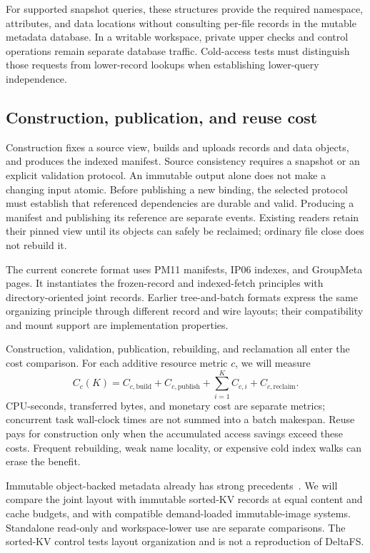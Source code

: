 For supported snapshot queries, these structures provide the required
namespace, attributes, and data locations without consulting per-file
records in the mutable metadata database. In a writable workspace, private
upper checks and control operations remain separate database traffic.
Cold-access tests must distinguish those requests from lower-record
lookups when establishing lower-query independence.

\subsection{Construction, publication, and reuse cost}

Construction fixes a source view, builds and uploads records and data
objects, and produces the indexed manifest. Source consistency requires a
snapshot or an explicit validation protocol. An immutable output alone
does not make a changing input atomic. Before publishing a new binding,
the selected protocol must establish that referenced dependencies are
durable and valid. Producing a manifest and publishing its reference are
separate events. Existing readers retain their pinned view until its
objects can safely be reclaimed; ordinary file close does not rebuild it.

The current concrete format uses PM11 manifests, IP06 indexes, and GroupMeta
pages. It instantiates the frozen-record and indexed-fetch principles with
directory-oriented joint records. Earlier tree-and-batch formats express
the same organizing principle through different record and wire layouts;
their compatibility and mount support are implementation properties.

Construction, validation, publication, rebuilding, and reclamation all enter
the cost comparison. For each additive resource metric $c$, we will measure
\begin{equation}
C_c(K)=C_{c,\mathrm{build}}+C_{c,\mathrm{publish}}
       +\sum_{i=1}^{K}C_{c,i}+C_{c,\mathrm{reclaim}}.
\end{equation}
CPU-seconds, transferred bytes, and monetary cost are separate metrics;
concurrent task wall-clock times are not summed into a batch makespan.
Reuse pays for construction only when the accumulated access savings exceed
these costs. Frequent rebuilding, weak name locality, or expensive cold
index walks can erase the benefit.

Immutable object-backed metadata already has strong
precedents~\cite{deltafs2021,cvmfs2011,nydus_rafs}. We will compare the joint
layout with immutable sorted-KV records at equal content and cache budgets,
and with compatible demand-loaded immutable-image systems. Standalone
read-only and workspace-lower use are separate comparisons. The sorted-KV
control tests layout organization and is not a reproduction of DeltaFS.
